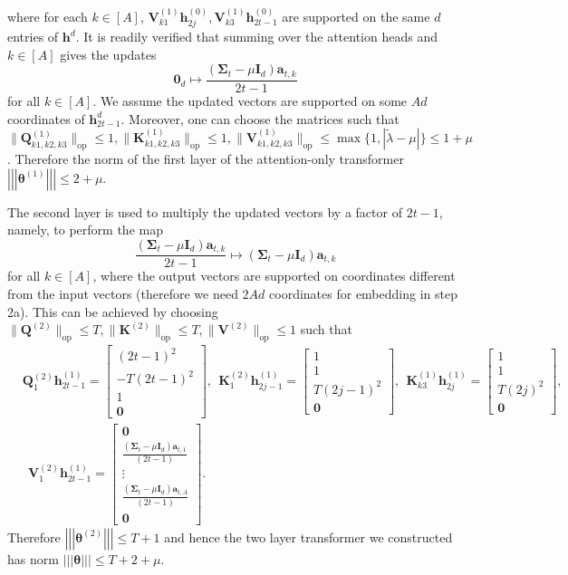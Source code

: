 \documentclass[10pt]{article}
\newcommand{\id}{\bI}
\newcommand{\lops}[1]{\|{#1}\|_{\mathrm{op}}}
\newcommand{\<}{\left\langle}
\renewcommand{\>}{\right\rangle}
\renewcommand{\bQ}{\mathbf{Q}}
\newcommand{\bzero}{{\mathbf 0}}
\newcommand{\nrmp}[1]{{\left|\!\left|\!\left|{#1}\right|\!\right|\!\right|}}
\newcommand{\partd}{{d}}
\newcommand{\Tpscov}{{{\mathbf\Sigma}}}
\newcommand{\prodeig}{{\mu}}
\def\bI{{\mathbf I}}
\def\bK{{\mathbf K}}
\def\bQ{{\mathbf Q}}
\def\bV{{\mathbf V}}
\def\btheta{{\boldsymbol \theta}}
\def\ba{{\mathbf a}}
\def\bh{{\mathbf h}}
\begin{document}
where for each $k\in[A]$, $\bV^{(1)}_{k1}\bh^{(0)}_{2j},\bV^{(1)}_{k3}\bh^{(0)}_{2t-1}$ are supported on the same $d$ entries of $\bh^\partd$.
It is readily verified that  summing over the attention heads and $k\in[A]$ gives the updates
$$ \bzero_d\mapsto\frac{(\Tpscov_t-\prodeig\id_d)\ba_{t,k}}{2t-1}$$ for all $k\in[A]$. We assume the updated vectors are supported on some $Ad$ coordinates of $\bh_{2t-1}^d$. Moreover, one can choose the matrices such that $\lops{\bQ^{(1)}_{k1,k2,k3}}\leq1,\lops{\bK^{(1)}_{k1,k2,k3}}\leq1,\lops{\bV^{(1)}_{k1,k2,k3}}\leq \max\{1,|\tilde\lambda-\prodeig|\}\leq1+\prodeig$. Therefore the norm of the first layer of the attention-only transformer $\nrmp{\btheta^{(1)}}\leq 2+\prodeig$.

The second layer is used to multiply the updated vectors by a factor of $2t-1$, namely, to perform the map
$$ \frac{(\Tpscov_t-\prodeig\id_d)\ba_{t,k}}{2t-1}\mapsto{(\Tpscov_t-\prodeig\id_d)\ba_{t,k}}$$ for all $k\in[A]$, where the output vectors are supported on coordinates different from the input vectors (therefore we need $2Ad$ coordinates for embedding in step 2a). This can be achieved by choosing $\lops{\bQ^{(2)}}\leq T, \lops{\bK^{(2)}}\leq T, \lops{\bV^{(2)}}\leq1$
such that \begin{align*}
    &
    \bQ^{(2)}_{1}\bh^{(1)}_{2t-1}=\begin{bmatrix}
         (2t-1)^2\\-T(2t-1)^2\\  1\\ \bzero
    \end{bmatrix},~~ \bK^{(2)}_{1}\bh^{(1)}_{2j-1}=\begin{bmatrix}
        1\\1\\ T(2j-1)^2\\\bzero
    \end{bmatrix},~~
    \bK^{(1)}_{k3}\bh^{(1)}_{2j}=\begin{bmatrix}
      1\\  1\\  T(2j)^2\\\bzero
    \end{bmatrix},\\&~~ \bV^{(2)}_{1}\bh^{(1)}_{2t-1}=\begin{bmatrix}
        \bzero\\ \frac{(\Tpscov_t-\prodeig\id_d)\ba_{t,1}}{(2t-1)}
\\\vdots\\
        \frac{(\Tpscov_t-\prodeig\id_d)\ba_{t,A}}{(2t-1)} \\ \bzero
    \end{bmatrix}.
\end{align*} Therefore $\nrmp{\btheta^{(2)}}\leq T+1$ and hence the two layer transformer we constructed has norm $\nrmp{\btheta}\leq T+2+\prodeig$.
\end{document}
